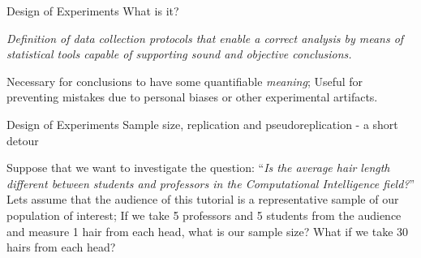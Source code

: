 \documentclass[t]{beamer}
\begin{document}

\begin{ftst}
{Design of Experiments}
{What is it?}
\vone\vone
\begin{block}{}
\centering \textit{Definition of data collection protocols that enable a correct analysis by means of statistical tools capable of supporting sound and objective conclusions.}
\end{block}
\vone
Necessary for conclusions to have some quantifiable \textit{meaning};
\vone
Useful for preventing mistakes due to personal biases or other experimental artifacts.
\end{ftst}


\begin{ftst}
{Design of Experiments}
{Sample size, replication and pseudoreplication - a short detour}
Suppose that we want to investigate the question: ``\textit{Is the average hair length different between students and professors in the Computational Intelligence field?}''
\vone
Lets assume that the audience of this tutorial is a representative sample of our population of interest;
\vone
If we take 5 professors and 5 students from the audience and measure 1 hair from each head, what is our sample size?
\vone\pause
What if we take 30 hairs from each head?
\end{ftst}

\end{document}
